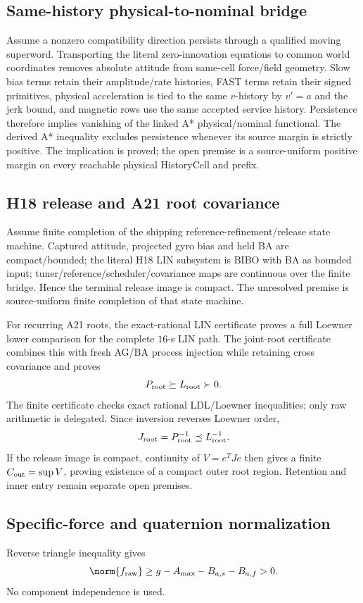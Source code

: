 \subsection{Same-history physical-to-nominal bridge}
Assume a nonzero compatibility direction persists through a qualified moving superword. Transporting the literal zero-innovation equations to common world coordinates removes absolute attitude from same-cell force/field geometry. Slow bias terms retain their amplitude/rate histories, FAST terms retain their signed primitives, physical acceleration is tied to the same \(v\)-history by \(v'=a\) and the jerk bound, and magnetic rows use the same accepted service history. Persistence therefore implies vanishing of the linked A* physical/nominal functional. The derived A* inequality excludes persistence whenever its source margin is strictly positive. The implication is proved; the open premise is a source-uniform positive margin on every reachable physical HistoryCell and prefix.

\subsection{H18 release and A21 root covariance}
Assume finite completion of the shipping reference-refinement/release state machine. Captured attitude, projected gyro bias and held BA are compact/bounded; the literal H18 LIN subsystem is BIBO with BA as bounded input; tuner/reference/scheduler/covariance maps are continuous over the finite bridge. Hence the terminal release image is compact. The unresolved premise is source-uniform finite completion of that state machine.

For recurring A21 roots, the exact-rational LIN certificate proves a full Loewner lower comparison for the complete \(16\)-s LIN path. The joint-root certificate combines this with fresh AG/BA process injection while retaining cross covariance and proves
\[
P_{\rm root}\succeq L_{\rm root}\succ0.
\]
The finite certificate checks exact rational LDL/Loewner inequalities; only raw arithmetic is delegated. Since inversion reverses Loewner order,
\[
J_{\rm root}=P_{\rm root}^{-1}\preceq L_{\rm root}^{-1}.
\]
If the release image is compact, continuity of \(V=e^TJe\) then gives a finite \(C_{\rm out}=\sup V\), proving existence of a compact outer root region. Retention and inner entry remain separate open premises.

\subsection{Specific-force and quaternion normalization}
Reverse triangle inequality gives
\[
\norm{f_{\rm raw}}\ge g-A_{\max}-B_{a,s}-B_{a,f}>0.
\]
No component independence is used.

